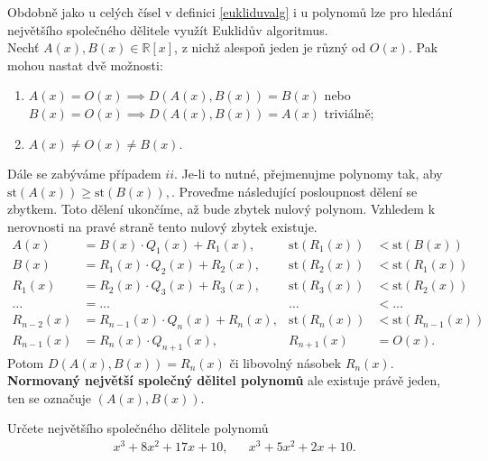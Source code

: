 \begin{pozn}
  Obdobně jako u celých čísel v definici \ref{eukliduvalg} i u polynomů lze pro hledání největšího společného dělitele využít Euklidův algoritmus.\\
  Nechť $A(x), B(x) \in \mathbb R [x]$, z nichž alespoň jeden je různý od $O(x)$. Pak mohou nastat dvě možnosti:
  \begin{enumerate}[$i.$]
    \item $A(x) = O(x) \implies D(A(x), B(x)) = B(x)$ nebo $B(x) = O(x) \implies D(A(x), B(x)) = A(x)$ triviálně;
    \item $A(x)\ne O(x)\ne B(x)$.
  \end{enumerate}
  Dále se zabýváme případem $ii$. Je-li to nutné, přejmenujme polynomy tak, aby $\text{st}(A(x)) \geq \text{st}(B(x)),$.
  Proveďme následující posloupnost dělení se zbytkem. Toto dělení ukončíme, až bude zbytek nulový polynom.
  Vzhledem k nerovnosti na pravé straně tento nulový zbytek existuje.
  \begin{align*}
    A(x) & = B(x) \cdot Q_1(x) + R_1(x),  & \text{st}(R_1(x)) & < \text{st}(B(x)) \\
    B(x) & = R_1(x) \cdot Q_2(x) + R_2(x), & \text{st}(R_2(x)) & < \text{st}(R_1(x)) \\
    R_1(x) & = R_2(x) \cdot Q_3(x) + R_3(x), & \text{st}(R_3(x)) & < \text{st}(R_2(x))\\
    \dots & = \dots & \dots & < \dots\\
    R_{n-2}(x) & = R_{n-1}(x) \cdot Q_n(x) + R_n(x), & \text{st}(R_n(x)) & < \text{st}(R_{n-1}(x)) \\
    R_{n-1}(x) & = R_{n}(x) \cdot Q_{n+1}(x), & R_{n+1}(x) & = O(x).
  \end{align*}
  Potom $D(A(x), B(x)) = R_n(x)$ či libovolný násobek $R_n(x)$. \textbf{Normovaný největší společný dělitel polynomů}
  ale existuje právě jeden, ten se označuje $(A(x), B(x))$.
\end{pozn}

\begin{priklad}
    Určete největšího společného dělitele polynomů
    \begin{align*}
        x^3+8x^2+17x+10,& &   x^3+5x^2+2x+10.
    \end{align*}
\end{priklad}

